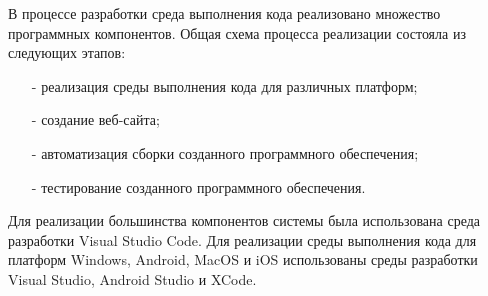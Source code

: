 В процессе разработки среда выполнения кода реализовано множество программных компонентов.
Общая схема процесса реализации состояла из
следующих этапов:
\begin{itemize}
    \item[-] реализация среды выполнения кода для различных платформ;
    \item[-] создание веб-сайта;
    \item[-] автоматизация сборки созданного программного обеспечения;
    \item[-] тестирование созданного программного обеспечения.
\end{itemize}

Для реализации большинства компонентов системы была использована среда разработки Visual Studio Code.
Для реализации среды выполнения кода для платформ Windows, Android, MacOS и iOS использованы среды разработки Visual Studio, Android Studio и XCode.
